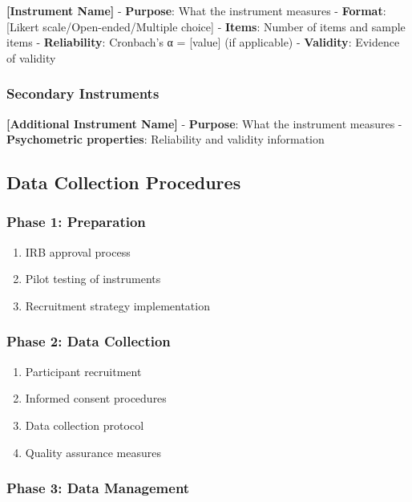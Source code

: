 \documentclass[
  12pt,
  letterpaper,
  12pt,
  letterpaper,
  oneside]{report}
\providecommand{\tightlist}{%
  \setlength{\itemsep}{0pt}\setlength{\parskip}{0pt}}
\begin{document}
\textbf{{[}Instrument Name{]}} - \textbf{Purpose}: What the instrument
measures - \textbf{Format}: {[}Likert scale/Open-ended/Multiple
choice{]} - \textbf{Items}: Number of items and sample items -
\textbf{Reliability}: Cronbach's α = {[}value{]} (if applicable) -
\textbf{Validity}: Evidence of validity

\subsubsection{Secondary Instruments}\label{secondary-instruments}

\textbf{{[}Additional Instrument Name{]}} - \textbf{Purpose}: What the
instrument measures - \textbf{Psychometric properties}: Reliability and
validity information

\subsection{Data Collection
Procedures}\label{data-collection-procedures}

\subsubsection{Phase 1: Preparation}\label{phase-1-preparation}

\begin{enumerate}
\def\labelenumi{\arabic{enumi}.}
\tightlist
\item
  IRB approval process
\item
  Pilot testing of instruments
\item
  Recruitment strategy implementation
\end{enumerate}

\subsubsection{Phase 2: Data Collection}\label{phase-2-data-collection}

\begin{enumerate}
\def\labelenumi{\arabic{enumi}.}
\tightlist
\item
  Participant recruitment
\item
  Informed consent procedures
\item
  Data collection protocol
\item
  Quality assurance measures
\end{enumerate}

\subsubsection{Phase 3: Data Management}\label{phase-3-data-management}
\end{document}
